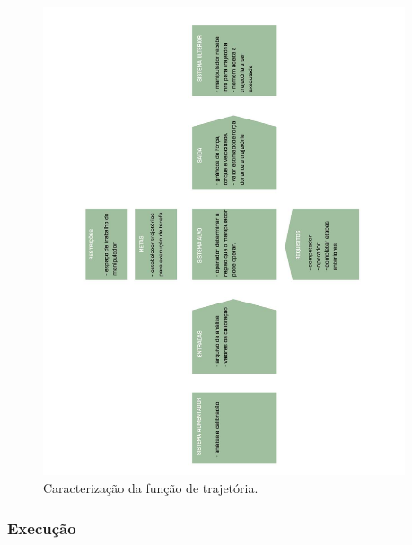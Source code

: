 \documentclass[12pt,a4paper]{article}
\begin{document}
\begin{figure}[H]
\begin{center}
  \includegraphics[width=0.95\textwidth]{figs/caracterizacao_trajetoria.jpg}
  \caption{Caracterização da função de trajetória.}
  \label{fig:caracterização trajetória}
\end{center}
\end{figure} 

\subsubsection {Execução}
\end{document}
